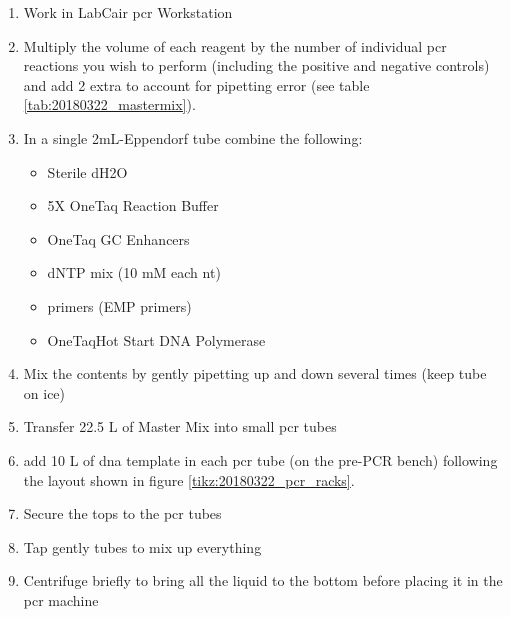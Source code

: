 \begin{enumerate}
\item Work in LabCair \gls{pcr} Workstation
\item Multiply the volume of each reagent by the number of individual \gls{pcr} reactions you wish to perform (including the positive and negative controls) and add 2 extra to account for pipetting error (see table \ref{tab:20180322_mastermix}).
\item In a single 2mL-Eppendorf tube combine the following:
	\begin{itemize}
	\item Sterile dH2O
	\item 5X OneTaq Reaction Buffer
	\item OneTaq GC Enhancers
	\item dNTP mix (10 mM each nt)
	\item primers (EMP primers)
	\item OneTaq\cR Hot Start DNA Polymerase
	\end{itemize}
\item Mix the contents by gently pipetting up and down several times (keep tube on ice)
\item Transfer  22.5 \textmu L of Master Mix into small \gls{pcr} tubes
\item add 10 \textmu L of \gls{dna} template in each \gls{pcr} tube (on the pre-PCR bench) following the layout shown in figure \ref{tikz:20180322_pcr_racks}.
\item Secure the tops to the \gls{pcr} tubes
\item Tap gently tubes to mix up everything
\item Centrifuge briefly to bring all the liquid to the bottom before placing it in the \gls{pcr} machine
\end{enumerate}

